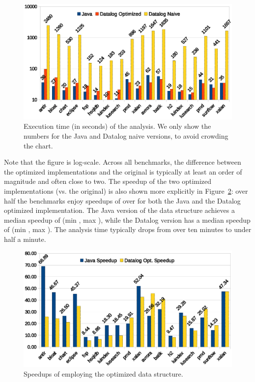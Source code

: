 \begin{figure}[htp]
\centering
\includegraphics[clip,width=0.77\linewidth, height=0.4275\linewidth]{assets/must-data/time.eps}
\caption[Execution times for the Java and both Datalog versions]{Execution time (in seconds) of the analysis. We only show the numbers for the Java and Datalog naive versions, to avoid crowding the chart.}
\label{fig:must-data:time-chart}
\end{figure}

Note that the figure is log-scale. Across all benchmarks, the difference between the optimized implementations and the original is typically at least an order of magnitude and often close to two.  The speedup of the two optimized implementations (vs. the original) is also shown more explicitly in Figure~\ref{fig:must-data:speedup-chart}: over half the benchmarks enjoy speedups of over  for both the Java and the Datalog optimized implementation. The Java version of the data structure achieves a median speedup of  (min , max ), while the Datalog version has a median speedup of  (min , max ).  The analysis time typically drops from over ten minutes to under half a minute. 

\begin{figure}[htp]
\centering
\includegraphics[clip,width=0.77\linewidth, height=0.4275\linewidth]{assets/must-data/speedup.eps}
\caption[Speedups of employing the optimized data structure]{Speedups of employing the optimized data structure.}
\label{fig:must-data:speedup-chart}
\end{figure}

